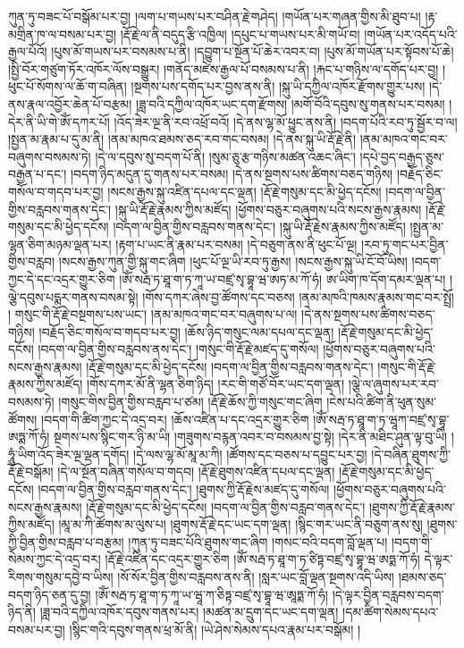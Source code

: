 ཀུན་ཏུ་བཟང་པོ་བསྒོམ་པར་བྱ། །ལག་པ་གཡས་པར་བཤིན་རྗེ་གཤེད། །གཡོན་པར་གཞན་གྱིས་མི་ཐུབ་པ། །རྟ་མགྲིན་ཁ་ལ་བསམ་པར་བྱ། །རྡོ་རྗེ་ལ་ནི་བདུད་རྩི་འཁྱིལ། །དཔུང་པ་གཡས་པར་མི་གཡོ་བ། །གཡོན་པར་འདོད་པའི་རྒྱལ་པོའོ། །པུས་མོ་གཡས་པར་བསམས་པ་ནི། །དབྱུག་པ་སྔོན་པོ་ཆེར་འབར་བ། །པུས་མོ་གཡོན་པར་སྟོབས་པོ་ཆེ། །སྤྱི་བོར་གཙུག་ཏོར་འཁོར་ལོས་བསྒྱུར། །གནོད་མཛེས་རྒྱལ་པོ་བསམས་པ་ནི། །རྐང་པ་གཉིས་ལ་དགོད་པར་བྱ། །ཕུང་པོ་སོགས་ལ་ཆོ་ག་བཞིན། །སྔགས་པས་དགོད་པར་བྱས་ནས་ནི། །སྐུ་ཡི་དཀྱིལ་འཁོར་རྫོགས་གྱུར་པས། །དེ་ནས་རྣལ་འབྱོར་ཆེན་པོ་བརྩམ། །ཟླ་བའི་དཀྱིལ་འཁོར་ཡང་དག་རྫོགས། །མགོ་བོའི་དབུས་སུ་གནས་པར་བསམ། །དེར་ནི་ཡི་གེ་ཨོཾ་དཀར་པོ། །འོད་ཟེར་ལྔ་ནི་རབ་འཕྲོ་བའོ། །དེ་ནས་ལྷ་མོ་ཕྱུང་ནས་ནི། །བདག་པོའི་རབ་ཏུ་སྦྱོར་བ་ལ། །སྤྱན་མ་རྣམ་པ་དུ་མ་ནི། །ནམ་མཁའ་ཐམས་ཅད་རབ་གང་བསམ། །དེ་ནས་སྐུ་ཡི་རྡོ་རྗེ་ནི། །ནམ་མཁའ་གང་བར་བཞུགས་བསམས་ཏེ། །དེ་ལ་དབུས་སུ་བདག་པོ་ནི། །སུམ་ཅུ་རྩ་གཉིས་མཚན་འཆང་ཞིང་། །དཔེ་བྱད་བརྒྱད་ཅུས་བརྒྱན་པ་དང་། །བདག་ཉིད་མདུན་དུ་གནས་པར་བསམ། །དེ་ནས་སྔགས་པས་ཚིགས་བཅད་གཉིས། །བརྗོད་ཅིང་གསོལ་བ་གདབ་པར་བྱ། །སངས་རྒྱས་སྐུ་འཛིན་དཔལ་དང་ལྡན། །རྡོ་རྗེ་གསུམ་དང་མི་ཕྱེད་དངོས། །བདག་ལ་བྱིན་གྱིས་བརླབས་གནས་དེང་། །སྐུ་ཡི་རྡོ་རྗེ་རྣམས་ཀྱིས་མཛོད། །ཕྱོགས་བཅུར་བཞུགས་པའི་སངས་རྒྱས་རྣམས། །རྡོ་རྗེ་གསུམ་དང་མི་ཕྱེད་དངོས། །བདག་ལ་བྱིན་གྱིས་བརླབས་གནས་དེང་། །སྐུ་ཡི་རྡོ་རྗེས་རྣམས་ཀྱིས་མཛོད། །སྤྱན་མ་ལྷན་ཅིག་མཉམ་ལྡན་པར། །རྟག་པ་ཡང་ནི་རྣམ་པར་བསམ། །དེ་བཅུག་ནས་ནི་ཕུང་པོ་ལྔ། །རབ་ཏུ་གང་པར་བྱིན་གྱིས་བརླབ། །སངས་རྒྱས་ཀུན་གྱི་སྐུ་གང་ཞིག །ཕུང་པོ་ལྔ་ཡི་རབ་ཏུ་རྒྱས། །སངས་རྒྱས་སྐུ་ཡི་ངོ་བོ་ཡིས། །བདག་ཀྱང་དེ་དང་འདྲར་གྱུར་ཅིག །ཨོཾ་སརྦ་ཏ་ཐཱ་ག་ཏ་ཀཱ་ཡ་བཛྲ་སྭ་བྷཱ་ཝ་ཨཏ་མ་ཀོ་ཧཾ། ཨ་ཡིག་ཁ་དོག་དམར་ལྡན་པ། །ལྕེ་དབུས་པདྨར་གནས་བསམ་སྟེ། །གོས་དཀར་ཞེས་བྱ་ཚོགས་དང་བཅས། །ནམ་མཁའི་ཁམས་རྣམས་གང་བར་སྤྲོ། །
གསུང་གི་རྡོ་རྗེ་བསྔགས་པས་ཡང་། །ནམ་མཁའ་གང་བར་བཞུགས་པ་ལ། །དེ་ནས་སྔགས་པས་ཚིགས་བཅད་གཉིས། །བརྗོད་ཅིང་གསོལ་བ་གདབ་པར་བྱ། །ཆོས་ཉིད་གསུང་ལམ་དཔལ་དང་ལྡན། །རྡོ་རྗེ་གསུམ་དང་མི་ཕྱེད་དངོས། །བདག་ལ་བྱིན་གྱིས་བརླབས་ནས་དེང་། །གསུང་གི་རྡོ་རྗེ་མཛད་དུ་གསོལ། །ཕྱོགས་བཅུར་བཞུགས་པའི་སངས་རྒྱས་རྣམས། །རྡོ་རྗེ་གསུམ་དང་མི་ཕྱེད་དངོས། །བདག་ལ་བྱིན་གྱིས་བརླབས་གནས་དེང་། །གསུང་གི་རྡོ་རྗེ་རྣམས་ཀྱིས་མཛོད། །གོས་དཀར་མོ་ནི་ལྷན་ཅིག་ཉིད། །རང་གི་གཙོ་བོར་ཡང་དག་ལྡན། །ལྕེ་ལ་ཞུགས་པར་རབ་བསམས་ཏེ། །གསུང་གིས་བྱིན་གྱིས་བརླབ་པ་ཙམ། །རྡོ་རྗེ་ཆོས་ཀྱི་གསུང་གང་ཞིག །ངེས་པའི་ཚིག་ནི་ཕུན་སུམ་ཚོགས། །བདག་གི་ཚིག་ཀྱང་དེ་འདྲ་བར། །ཆོས་འཛིན་པ་དང་འདྲར་གྱུར་ཅིག །ཨོཾ་སརྦ་ཏ་ཐཱ་ག་ཏ་ཝཱཀ་བཛྲ་སྭ་བྷཱ་ཨཏྨ་ཀོ་ཧཾ། སྔགས་པས་སྙིང་གར་ཉི་མ་ཡི། །གཟུགས་བརྙན་འབར་བ་བསམས་བྱ་སྟེ། །དེར་ནི་མཐིང་ཤུན་ལྟ་བུ་ཡི། །ཧཱུཾ་ཡིག་འོད་ཟེར་ལྔ་ལྡན་དགོད། །དེ་ལས་ལྷ་མོ་མཱ་མ་ཀི། །ཚོགས་དང་བཅས་པ་དབྱུང་པར་བྱ། །དེ་བཞིན་ཐུགས་ཀྱི་རྡོ་རྗེ་བསྒོམ། །དེ་ལ་སྔོན་བཞིན་གསོལ་བ་གདབ། །རྡོ་རྗེ་ཐུགས་འཛིན་དཔལ་དང་ལྡན། །རྡོ་རྗེ་གསུམ་དང་མི་ཕྱེད་དངོས། །བདག་ལ་བྱིན་གྱིས་བརླབ་གནས་དེང་། །ཐུགས་ཀྱི་རྡོ་རྗེས་མཛད་དུ་གསོལ། །ཕྱོགས་བཅུར་བཞུགས་པའི་སངས་རྒྱས་རྣམས། །རྡོ་རྗེ་གསུམ་དང་མི་ཕྱེད་དངོས། །བདག་ལ་བྱིན་གྱིས་བརླབ་གནས་དེང་། །ཐུགས་ཀྱི་རྡོ་རྗེ་རྣམས་ཀྱིས་མཛོད། །མཱ་མ་ཀི་ཚོགས་མ་ལུས་པ། །ཐུགས་རྡོ་རྗེ་དང་ཡང་དག་ལྡན། །སྙིང་གར་ཡང་ནི་བཅུག་ནས་སུ། །ཐུགས་ཀྱི་བྱིན་གྱིས་བརླབ་པ་བརྩམ། །ཀུན་ཏུ་བཟང་པོའི་ཐུགས་གང་ཞིག །གསང་བའི་བདག་བློ་ལྡན་པ། །བདག་གི་སེམས་ཀྱང་དེ་འདྲ་བར། །རྡོ་རྗེ་འཛིན་དང་འདྲར་གྱུར་ཅིག །ཨོཾ་སརྦ་ཏ་ཐཱ་ག་ཏ་ཙིཏྟ་བཛྲ་སྭ་བྷཱ་ཝ་ཨཏྨ་ཀོ་ཧཾ། དེ་ལྟར་རིགས་གསུམ་དབྱེ་བ་ཡིས། །སོ་སོར་བྱིན་གྱིས་བརླབས་ནས་ནི། །སླར་ཡང་བློ་ལྡན་སྔགས་འདི་ཡིས། །ཐམས་ཅད་བདག་ཉིད་ཅན་དུ་བྱ། །ཨོཾ་སརྦ་ཏ་ཐཱ་ག་ཏ་ཀཱ་ཡ་ཝཱ་ཀ་ཅིཏྟ་བཛྲ་སྭ་བྷཱ་ཝ་ཨཱཏྨ་ཀོ་ཧཾ། །དེ་ལྟར་བྱིན་བརླབས་བདག་ཉིད་ནི། །ཟླ་བའི་དཀྱིལ་འཁོར་དབུས་གནས་པར། །མཚན་མ་དྲུག་དང་ཡང་དག་ལྡན། །དམ་ཚིག་སེམས་དཔའ་བསམ་པར་བྱ། །སྙིང་གའི་དབུས་གནས་ཕྲ་མོ་ནི། །ཡེ་ཤེས་སེམས་དཔའ་རྣམ་པར་བསྒོམ། །
